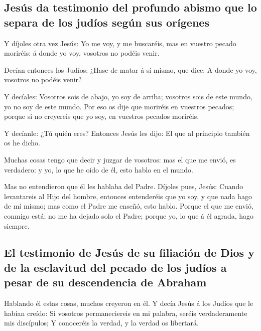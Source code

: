 \hypertarget{jesuxfas-da-testimonio-del-profundo-abismo-que-lo-separa-de-los-juduxedos-seguxfan-sus-oruxedgenes}{%
\subsection{Jesús da testimonio del profundo abismo que lo separa de los
judíos según sus
orígenes}\label{jesuxfas-da-testimonio-del-profundo-abismo-que-lo-separa-de-los-juduxedos-seguxfan-sus-oruxedgenes}}

 Y díjoles otra vez Jesús: Yo me voy, y me buscaréis, mas
en vuestro pecado moriréis: á donde yo voy, vosotros no podéis venir.

 Decían entonces los Judíos: ¿Hase de matar á sí mismo, que
dice: A donde yo voy, vosotros no podéis venir?

 Y decíales: Vosotros sois de abajo, yo soy de arriba;
vosotros sois de este mundo, yo no soy de este mundo.  Por
eso os dije que moriréis en vuestros pecados; porque si no creyereis que
yo soy, en vuestros pecados moriréis.

 Y decíanle: ¿Tú quién eres? Entonces Jesús les dijo: El
que al principio también os he dicho.

 Muchas cosas tengo que decir y juzgar de vosotros: mas el
que me envió, es verdadero: y yo, lo que he oído de él, esto hablo en el
mundo.

 Mas no entendieron que él les hablaba del Padre.
 Díjoles pues, Jesús: Cuando levantareis al Hijo del
hombre, entonces entenderéis que yo soy, y que nada hago de mí mismo;
mas como el Padre me enseñó, esto hablo.  Porque el que me
envió, conmigo está; no me ha dejado solo el Padre; porque yo, lo que á
él agrada, hago siempre.

\hypertarget{el-testimonio-de-jesuxfas-de-su-filiaciuxf3n-de-dios-y-de-la-esclavitud-del-pecado-de-los-juduxedos-a-pesar-de-su-descendencia-de-abraham}{%
\subsection{El testimonio de Jesús de su filiación de Dios y de la
esclavitud del pecado de los judíos a pesar de su descendencia de
Abraham}\label{el-testimonio-de-jesuxfas-de-su-filiaciuxf3n-de-dios-y-de-la-esclavitud-del-pecado-de-los-juduxedos-a-pesar-de-su-descendencia-de-abraham}}

 Hablando él estas cosas, muchos creyeron en él.
 Y decía Jesús á los Judíos que le habían creído: Si
vosotros permaneciereis en mi palabra, seréis verdaderamente mis
discípulos;  Y conoceréis la verdad, y la verdad os
libertará.


